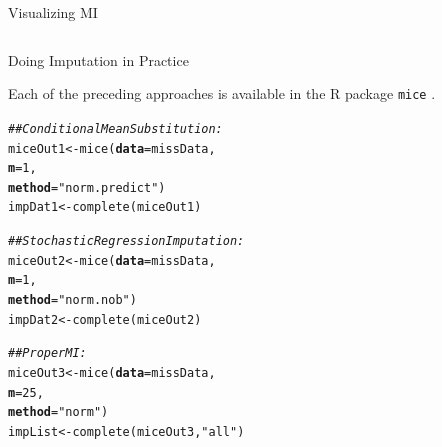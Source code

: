 \documentclass{beamer}\usepackage[]{graphicx}\usepackage[]{color}
\makeatletter
\newcommand{\hlnum}[1]{\textcolor[rgb]{0.69,0.494,0}{#1}}%
\newcommand{\hlstr}[1]{\textcolor[rgb]{0.749,0.012,0.012}{#1}}%
\newcommand{\hlcom}[1]{\textcolor[rgb]{0.514,0.506,0.514}{\textit{#1}}}%
\newcommand{\hlstd}[1]{\textcolor[rgb]{0,0,0}{#1}}%
\newcommand{\hlkwb}[1]{\textcolor[rgb]{0,0.341,0.682}{#1}}%
\newcommand{\hlkwc}[1]{\textcolor[rgb]{0,0,0}{\textbf{#1}}}%
\newcommand{\hlkwd}[1]{\textcolor[rgb]{0.004,0.004,0.506}{#1}}%
\newenvironment{kframe}{%
 \def\at@end@of@kframe{}%
 \ifinner\ifhmode%
  \def\at@end@of@kframe{\end{minipage}}%
  \begin{minipage}{\columnwidth}%
 \fi\fi%
 \def\FrameCommand##1{\hskip\@totalleftmargin \hskip-\fboxsep
 \colorbox{shadecolor}{##1}\hskip-\fboxsep
     \hskip-\linewidth \hskip-\@totalleftmargin \hskip\columnwidth}%
 \MakeFramed {\advance\hsize-\width
   \@totalleftmargin\z@ \linewidth\hsize
   \@setminipage}}%
 {\par\unskip\endMakeFramed%
 \at@end@of@kframe}
\newenvironment{knitrout}{}{} %
\makeatother
\begin{document}
\begin{frame}{Visualizing MI}
\begin{columns}
\end{columns}

\end{frame}


\begin{frame}[shrink = 5, fragile]{Doing Imputation in Practice}
  
  Each of the preceding approaches is available in the \textsf{R} package 
  \texttt{mice} \citep{mice}.
  
\begin{knitrout}\footnotesize
{}\color{fgcolor}\begin{kframe}
\begin{alltt}
\hlcom{## Conditional Mean Substitution:}
\hlstd{miceOut1} \hlkwb{<-} \hlkwd{mice}\hlstd{(}\hlkwc{data}   \hlstd{= missData,}
                 \hlkwc{m}      \hlstd{=} \hlnum{1}\hlstd{,}
                 \hlkwc{method} \hlstd{=} \hlstr{"norm.predict"}\hlstd{)}
\hlstd{impDat1} \hlkwb{<-} \hlkwd{complete}\hlstd{(miceOut1)}

\hlcom{## Stochastic Regression Imputation:}
\hlstd{miceOut2} \hlkwb{<-} \hlkwd{mice}\hlstd{(}\hlkwc{data}   \hlstd{= missData,}
                 \hlkwc{m}      \hlstd{=} \hlnum{1}\hlstd{,}
                 \hlkwc{method} \hlstd{=} \hlstr{"norm.nob"}\hlstd{)}
\hlstd{impDat2} \hlkwb{<-} \hlkwd{complete}\hlstd{(miceOut2)}

\hlcom{## Proper MI:}
\hlstd{miceOut3} \hlkwb{<-} \hlkwd{mice}\hlstd{(}\hlkwc{data}   \hlstd{= missData,}
                 \hlkwc{m}      \hlstd{=} \hlnum{25}\hlstd{,}
                 \hlkwc{method} \hlstd{=} \hlstr{"norm"}\hlstd{)}
\hlstd{impList} \hlkwb{<-} \hlkwd{complete}\hlstd{(miceOut3,} \hlstr{"all"}\hlstd{)}
\end{alltt}
\end{kframe}
\end{knitrout}

\end{frame}

\watermarkon %
\end{document}
